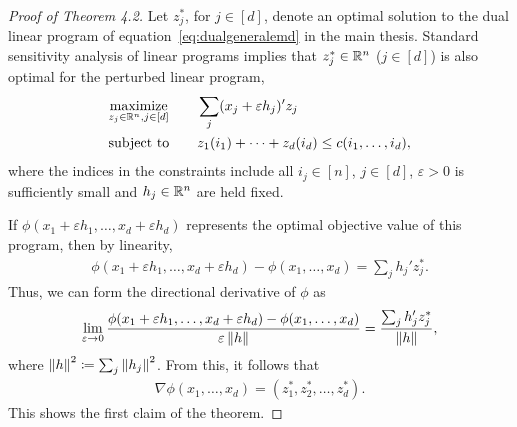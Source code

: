 \begin{proof}[Proof of Theorem 4.2]
Let $z_j^*$, for $j\in[d]$, denote an optimal solution to the dual linear program of equation~\eqref{eq:dualgeneralemd} in the main thesis.  Standard sensitivity analysis of linear programs implies that $z_j^*\in\mathbb{R}^{n}$ ($j\in[d]$) is
 also optimal for the perturbed linear program,
\begin{alignat*}{2}\begin{split}
&\underset{z_j\in\mathbb{R}^n, j\in[d]}{\textrm{maximize}}\qquad\sum_{j} (x_j+\varepsilon h_j)'z_j\\
&\textrm{subject to}\qquad z_{1}(i_1)+\cdots+z_{d}(i_{d})\leq c(i_1,\ldots,i_{d}),\end{split}
\end{alignat*}
where the indices in the constraints include all $i_j\in[n]$, $j\in[d]$, $\varepsilon>0$ is sufficiently small and $h_j\in \mathbb{R}^{n}$ are held fixed.

If $\phi(x_1+\varepsilon h_1,\ldots,x_{d}+\varepsilon h_{d})$ represents the optimal objective value of this program, then by linearity, 
\begin{align*}
    \phi(x_1+\varepsilon h_1,\ldots,x_{d}+\varepsilon h_{d}) - \phi(x_1,\ldots,x_{d}) = \sum_{j} h_j'z^*_j.
\end{align*}
Thus, we can form the directional derivative of $\phi$ as
\begin{align*}
\lim_{\varepsilon\rightarrow 0}\frac{  \phi(x_1+\varepsilon h_1,\ldots,x_{d}+\varepsilon h_{d}) - \phi(x_1,\ldots,x_{d}) }{\varepsilon\left\|h\right\|}
=\frac{\sum_{j} h_j'z^*_j}{\left\|h\right\|},
\end{align*}
where $\left\|h\right\|^2\coloneqq \sum_{j}\left\|h_j\right\|^2$.
From this, it follows that 
\begin{align*}
    \nabla \phi(x_1,\ldots,x_{d}) = (z_1^*, z_2^*,\ldots, z_{d}^*).\end{align*}
This shows the first claim of the theorem.


\end{proof}
